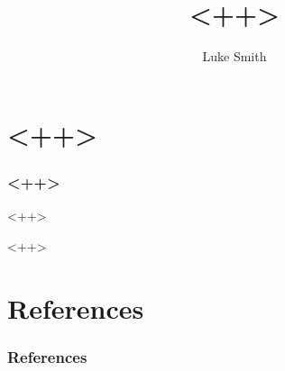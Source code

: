 \documentclass{beamer}
\title{<++>}
\author{Luke Smith}
\institute{University of Arizona}
\begin{document}
\ttfamily
\begin{frame}

\maketitle

\end{frame}

\section{<++>}

\begin{frame}
\frametitle{<++>}

<++>

\end{frame}

<++>

\section{References}

\begin{frame}
\frametitle{References}
\printbibliography
\end{frame}
\end{document}
